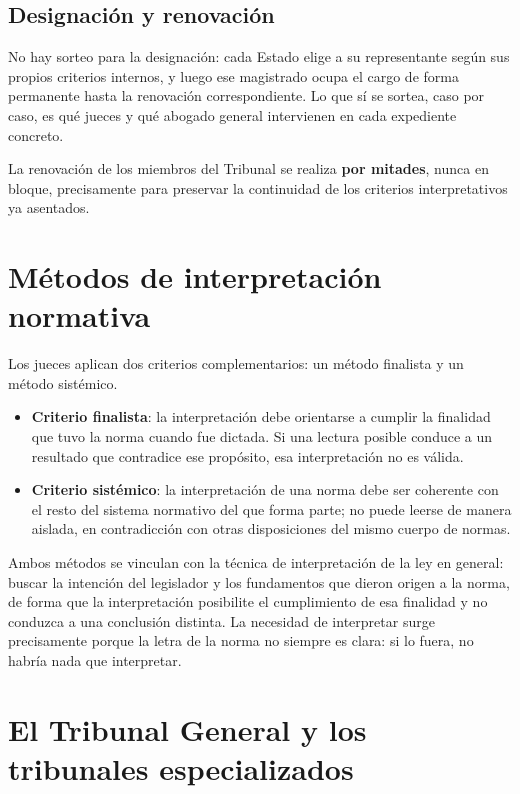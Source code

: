 \documentclass[12pt,oneside]{book}
\begin{document}
\subsection{Designación y renovación}

No hay sorteo para la designación: cada Estado elige a su representante según sus propios criterios internos, y luego ese magistrado ocupa el cargo de forma permanente hasta la renovación correspondiente. Lo que sí se sortea, caso por caso, es qué jueces y qué abogado general intervienen en cada expediente concreto.

La renovación de los miembros del Tribunal se realiza \textbf{por mitades}, nunca en bloque, precisamente para preservar la continuidad de los criterios interpretativos ya asentados.

\section{Métodos de interpretación normativa}

Los jueces aplican dos criterios complementarios: un método finalista y un método sistémico.

\begin{itemize}
    \item \textbf{Criterio finalista}: la interpretación debe orientarse a cumplir la finalidad que tuvo la norma cuando fue dictada. Si una lectura posible conduce a un resultado que contradice ese propósito, esa interpretación no es válida.
    \item \textbf{Criterio sistémico}: la interpretación de una norma debe ser coherente con el resto del sistema normativo del que forma parte; no puede leerse de manera aislada, en contradicción con otras disposiciones del mismo cuerpo de normas.
\end{itemize}

Ambos métodos se vinculan con la técnica de interpretación de la ley en general: buscar la intención del legislador y los fundamentos que dieron origen a la norma, de forma que la interpretación posibilite el cumplimiento de esa finalidad y no conduzca a una conclusión distinta. La necesidad de interpretar surge precisamente porque la letra de la norma no siempre es clara: si lo fuera, no habría nada que interpretar.

\section{El Tribunal General y los tribunales especializados}
\end{document}
